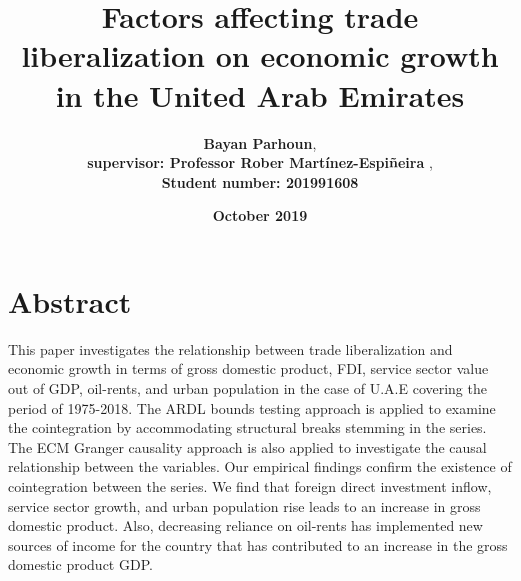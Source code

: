 \documentclass[12pt,a4 paper,title page]{article}
\title{\textbf{Factors affecting trade liberalization on economic growth in  the United Arab Emirates}}
\author{\large\textbf{Bayan Parhoun}, \\
\textbf{supervisor: Professor Rober Martínez-Espiñeira }, \\
\textbf{Student number: 201991608}}
\date{\Large{\textbf{October 2019}}}
\begin{document}
\maketitle
\hfill
\hfill
\section{Abstract} 
This paper investigates the relationship between trade liberalization and economic growth in terms of gross domestic product, \ac{FDI}, service sector value out of GDP, oil-rents, and urban population in the case of \ac{U.A.E} covering the period of 1975-2018. The \ac{ARDL} bounds testing approach is applied to examine
the cointegration by accommodating structural breaks stemming in the series. The \ac{ECM} Granger causality
approach is also applied to investigate the causal relationship between the variables. Our empirical findings
confirm the existence of cointegration between the series. We find that foreign direct investment inflow, service sector growth, and urban population rise leads to an increase in gross domestic product. Also, decreasing reliance on oil-rents has implemented new sources of income for the country that has contributed to an increase in the gross domestic product \ac{GDP}. 
\end{document}

